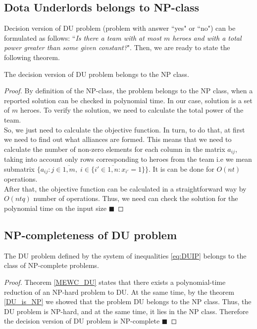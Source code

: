 \documentclass[smallextended]{svjour3}       %
\begin{document}
\subsection{Dota Underlords belongs to NP-class}
Decision version of DU problem (problem with answer ``yes" or ``no") can be formulated as follows: ``\textit{Is there a team with at most $ m $ heroes and with a total power greater than some given constant?}". Then, we are ready to state the following theorem.
\begin{theorem}
\label{DU_is_NP}
The decision version of DU problem belongs to the  NP class.
\end{theorem}
\begin{proof}
By definition of the NP-class, the problem belongs to the NP class, when a reported solution can be checked in polynomial time. In our case, solution is a set of $m$ heroes. To verify the solution, we need to calculate the total power of the team.\\
So, we just need to calculate the objective function. In turn, to do that, at first we need to find out what alliances are formed. This means that we need to calculate the number of non-zero elements for each column in the matrix $a_{ij}$, taking into account only rows corresponding to heroes from the team i.e  we mean submatrix $\{a_{ij}:  j \in \overline{1,m},\; i \in \{  i' \in \overline{1,n} :   x_{i'} = 1 \}  \}$. It is can be done for $O(nt)$ operations. \\
After that, the objective function can be calculated in a straightforward way by $O(ntq)$ number of operations. Thus, we need can check the solution for the polynomial time on the input size  $\blacksquare$
\end{proof}

\subsection{NP-completeness of DU problem}
\begin{theorem}
	The DU problem defined by the system of inequalities \eqref{eq:DUIP}  belongs to the class of NP-complete problems.
\end{theorem}

\begin{proof}
Theorem \ref{MEWC_DU} states that there exists a polynomial-time reduction of an NP-hard problem to DU. At the same time, by the theorem \ref{DU_is_NP} we showed that the problem DU belongs to the NP class. Thus, the DU problem is NP-hard, and at the same time, it lies in the NP class. Therefore the decision version of DU problem is NP-complete $\blacksquare$
\end{proof}
\end{document}
